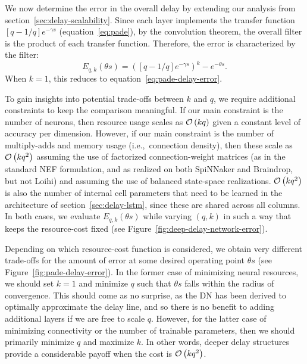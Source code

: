 We now determine the error in the overall delay by extending our analysis from section~\ref{sec:delay-scalability}.
Since each layer implements the transfer function $[q-1/q]e^{-\gamma s}$ (equation~\ref{eq:pade}), by the convolution theorem, the overall filter is the product of each transfer function.
Therefore, the error is characterized by the filter:
\begin{equation} \label{eq:deep-delay-network-error}
E_{q,k}(\theta s) = \left( [q-1/q]e^{-\gamma s} \right)^k - e^{-\theta s} \text{.}
\end{equation}
When $k = 1$, this reduces to equation~\ref{eq:pade-delay-error}.


To gain insights into potential trade-offs between $k$ and $q$, we require additional constraints to keep the comparison meaningful.
If our main constraint is the number of neurons, then resource usage scales as $\mathcal{O}\left({k q}\right)$ given a constant level of accuracy per dimension.
However, if our main constraint is the number of multiply-adds and memory usage (i.e.,~connection density), then these scale as $\mathcal{O}\left({k q^2}\right)$ assuming the use of factorized connection-weight matrices (as in the standard NEF formulation, and as realized on both SpiNNaker and Braindrop, but not Loihi) and assuming the use of balanced state-space realizations.
$\mathcal{O}\left({k q^2}\right)$ is also the number of internal cell parameters that need to be learned in the architecture of section~\ref{sec:delay-lstm}, since these are shared across all columns.
In both cases, we evaluate $E_{q,k}(\theta s)$ while varying $(q, k)$ in such a way that keeps the resource-cost fixed (see Figure~\ref{fig:deep-delay-network-error}).

Depending on which resource-cost function is considered, we obtain very different trade-offs for the amount of error at some desired operating point $\theta s$ (see Figure~\ref{fig:pade-delay-error}).
In the former case of minimizing neural resources, we should set $k = 1$ and minimize $q$ such that $\theta s$ falls within the radius of convergence.
This should come as no surprise, as the DN has been derived to optimally approximate the delay line, and so there is no benefit to adding additional layers if we are free to scale $q$.
However, for the latter case of minimizing connectivity or the number of trainable parameters, then we should primarily minimize $q$ and maximize $k$.
In other words, deeper delay structures provide a considerable payoff when the cost is $\mathcal{O}\left({kq^2}\right)$.

